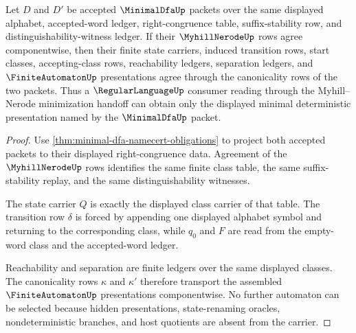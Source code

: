\begin{theorem}
\label{thm:minimal-dfa-myhill-nerode-canonicality}
Let $D$ and $D'$ be accepted $\MinimalDfaUp$ packets over the same displayed alphabet, accepted-word ledger, right-congruence table, suffix-stability row, and distinguishability-witness ledger. If their $\MyhillNerodeUp$ rows agree componentwise, then their finite state carriers, induced transition rows, start classes, accepting-class rows, reachability ledgers, separation ledgers, and $\FiniteAutomatonUp$ presentations agree through the canonicality rows of the two packets. Thus a $\RegularLanguageUp$ consumer reading through the Myhill--Nerode minimization handoff can obtain only the displayed minimal deterministic presentation named by the $\MinimalDfaUp$ packet.
\end{theorem}
\begin{proof}
Use \autoref{thm:minimal-dfa-namecert-obligations} to project both accepted packets to their displayed right-congruence data. Agreement of the $\MyhillNerodeUp$ rows identifies the same finite class table, the same suffix-stability replay, and the same distinguishability witnesses.

The state carrier $Q$ is exactly the displayed class carrier of that table. The transition row $\delta$ is forced by appending one displayed alphabet symbol and returning to the corresponding class, while $q_0$ and $F$ are read from the empty-word class and the accepted-word ledger.

Reachability and separation are finite ledgers over the same displayed classes. The canonicality rows $\kappa$ and $\kappa'$ therefore transport the assembled $\FiniteAutomatonUp$ presentations componentwise. No further automaton can be selected because hidden presentations, state-renaming oracles, nondeterministic branches, and host quotients are absent from the carrier.
\end{proof}



